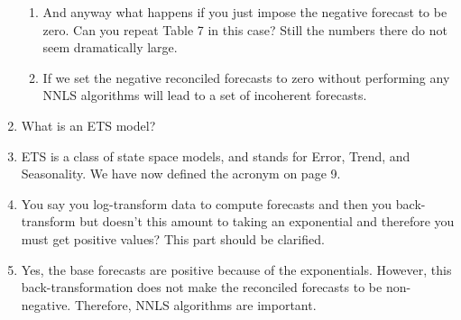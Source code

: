 \documentclass[10pt,a4paper]{article}
\begin{document}
\begin{enumerate}
\begin{enumerate}
	\item And anyway what happens if you just impose the negative forecast to be zero. Can you repeat Table 7 in this case? Still the numbers there do not seem dramatically large.
	\item [] {\color{blue} If we set the negative reconciled forecasts to zero without performing any NNLS algorithms will lead to a set of incoherent forecasts.}
\end{enumerate}
\item What is an ETS model?
\item [] {\color{blue} ETS is a class of state space models, and stands for Error, Trend, and Seasonality. We have now defined the acronym on page 9.}
\item You say you log-transform data to compute forecasts and then you back-transform but doesn't this amount to taking an exponential and therefore you must get positive values? This part should be clarified.
\item [] {\color{blue} Yes, the base forecasts are positive because of the exponentials. However, this back-transformation does not make the reconciled forecasts to be non-negative. Therefore, NNLS algorithms are important.}
\end{enumerate}
\end{document}
